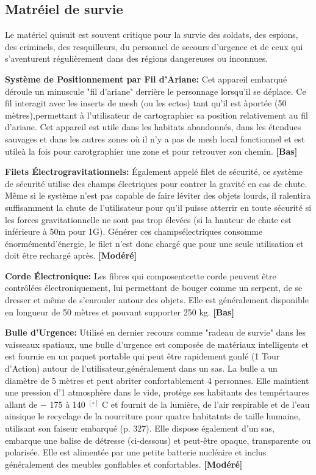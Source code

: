 \subsection{Matréiel de survie} \label{sec:survival-gear} 

Le matériel quisuit est souvent critique pour la survie des soldats, des espions, des criminels, des resquilleurs, du personnel de secours d'urgence et de ceux qui s'aventurent régulièrement dans des régions dangereuses ou inconnues. 

\textbf{Système de Positionnement par Fil d'Ariane:} Cet appareil embarqué déroule un minuscule "fil d'ariane" derrière le personnage lorsqu'il se déplace. Ce fil interagit avec les inserts de mesh (ou les ectos) tant qu'il est àportée (50 mètres),permettant à l'utilisateur de cartographier sa position relativement au fil d'ariane. Cet appareil est utile dans les habitats abandonnés, dans les étendues sauvages et dans les autres zones où il n'y a pas de mesh local fonctionnel et est utileà la fois pour carotgraphier une zone et pour retrouver son chemin. \textbf{[Bas]} 

\textbf{Filets Électrogravitationnels:} Également appelé filet de sécurité, ce système de sécurité utilise des champs électriques pour contrer la gravité en cas de chute. Même si le système n'est pas capable de faire léviter des objets lourds, il ralentira suffisamment la chute de l'utilisateur pour qu'il puisse atterrir en toute sécurité si les forces gravitationnelle ne sont pas trop élevées (si la hauteur de chute est inférieure à 50m pour 1G). Générer ces champsélectriques consomme énormémentd'énergie, le filet n'est donc chargé que pour une seule utilisation et doit être rechargé après. \textbf{[Modéré]} 

\textbf{Corde Électronique:} Les fibres qui composentcette corde peuvent être contrôlées électroniquement, lui permettant de bouger comme un serpent, de se dresser et même de s'enrouler autour des objets. Elle est généralement disponible en longueur de 50 mètres et pouvant supporter 250 kg. \textbf{[Bas]} 

\textbf{Bulle d'Urgence:} Utilisé en dernier recours comme "radeau de survie" dans les vaisseaux spatiaux, une bulle d'urgence est composée de matériaux intelligents et est fournie en un paquet portable qui peut être rapidement gonlé (1 Tour d'Action) autour de l'utilisateur,généralement dans un sas. La bulle a un diamètre de 5 mètres et peut abriter confortablement 4 personnes. Elle maintient une pression d'1 atmosphère dans le vide, protège ses habitants des tempértaures allant de $-$ 175 à 140 $^[\circ]$ C et fournit de la lumière, de l'air respirable et de l'eau ainsique le recyclage de la nourriture pour quatre habitatnts de taille humaine, utilisant son faiseur embarqué (p. 327). Elle dispose également d'un sas, embarque une balise de détresse (ci-dessous) et peut-être opaque, transparente ou polarisée. Elle est alimentée par une petite batterie nucléaire et inclus généralement des meubles gonflables et confortables. \textbf{[Modéré]} 

